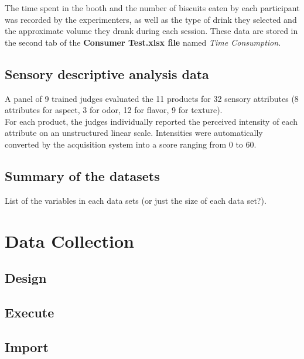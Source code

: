 \documentclass[
]{book}
\begin{document}
The time spent in the booth and the number of biscuits eaten by each participant was recorded by the experimenters, as well as the type of drink they selected and the approximate volume they drank during each session. These data are stored in the second tab of the \textbf{Consumer Test.xlsx file} named \emph{Time Consumption}.

\hypertarget{sensory-descriptive-analysis-data}{%
\section{Sensory descriptive analysis data}\label{sensory-descriptive-analysis-data}}

A panel of 9 trained judges evaluated the 11 products for 32 sensory attributes (8 attributes for aspect, 3 for odor, 12 for flavor, 9 for texture).\\
For each product, the judges individually reported the perceived intensity of each attribute on an unstructured linear scale. Intensities were automatically converted by the acquisition system into a score ranging from 0 to 60.

\hypertarget{summary-of-the-datasets}{%
\section{Summary of the datasets}\label{summary-of-the-datasets}}

List of the variables in each data sets (or just the size of each data set?).

\hypertarget{data-collection}{%
\chapter{Data Collection}\label{data-collection}}

\hypertarget{design-1}{%
\section{Design}\label{design-1}}

\hypertarget{execute-1}{%
\section{Execute}\label{execute-1}}

\hypertarget{import-1}{%
\section{Import}\label{import-1}}
\end{document}
